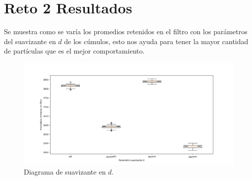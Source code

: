 \documentclass{article}
\begin{document}
\section{Reto 2 Resultados}\label{}
Se muestra como se varía los promedios retenidos en el filtro con los parámetros del suavizante en $d$ de los cúmulos, esto nos ayuda para tener la mayor cantidad de partículas que es el mejor comportamiento. 

\begin{figure}
    \centering
    \includegraphics[width=210mm]{Figure_1.1.png}
    \caption{Diagrama de suavizante en $d$.}
    \label{figure}
\end{figure}

\newpage


\end{document}
